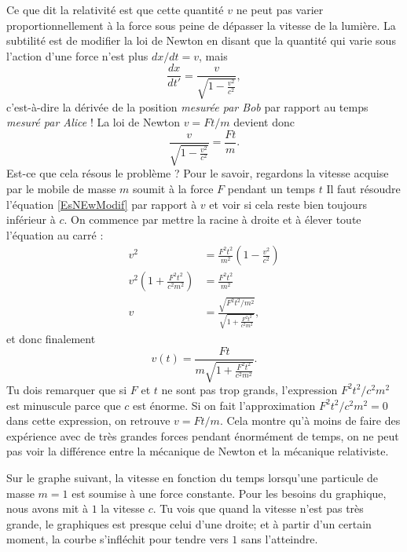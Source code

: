 Ce que dit la relativité est que cette quantité \( v\) ne peut pas varier proportionnellement à la force sous peine de dépasser la vitesse de la lumière. La subtilité est de modifier la loi de Newton en disant que la quantité qui varie sous l'action d'une force n'est plus \( dx/dt=v\), mais
\[
	\frac{ dx }{ dt' }=   \frac{ v }{ \sqrt{1-\frac{ v^2 }{ c^2 }} },
\]
c'est-à-dire la dérivée de la position \emph{mesurée par Bob} par rapport au temps \emph{mesuré par Alice} !  La loi de Newton \( v=Ft/m\) devient donc
\begin{equation}	\label{EsNEwModif}
	\frac{ v }{ \sqrt{1-\frac{ v^2 }{ c^2 }} }=\frac{ Ft }{ m }.
\end{equation}
Est-ce que cela résous le problème ? Pour le savoir, regardons la vitesse acquise par le mobile de masse \( m\) soumit à la force \( F\) pendant un temps \( t\) Il faut résoudre l'équation \eqref{EsNEwModif} par rapport à \( v\) et voir si cela reste bien toujours inférieur à \( c\). On commence par mettre la racine à droite et à élever toute l'équation au carré :
\[
	\begin{split}
		v^2&=\frac{ F^2t^2 }{ m^2 }\left( 1-\frac{ v^2 }{ c^2 } \right)\\
		v^2\left( 1+\frac{ F^2t^2 }{ c^2m^2 } \right)&=\frac{ F^2t^2 }{ m^2 }\\
		v&=\frac{ \sqrt{F^2t^2/m^2} }{ \sqrt{1+\frac{ F^2t^2 }{ c^2m^2 }} },
	\end{split}
\]
et donc finalement
\begin{equation}	\label{EqVfntRel}
	v(t)=\frac{ Ft }{ m\sqrt{1+\frac{ F^2t^2 }{ c^2m^2 }} }.
\end{equation}
Tu dois remarquer que si \( F\) et \( t\) ne sont pas trop grands, l'expression \( F^2t^2/c^2m^2\) est minuscule parce que \( c\) est énorme. Si on fait l'approximation \( F^2t^2/c^2m^2=0\) dans cette expression, on retrouve \( v=Ft/m\). Cela montre qu'à moins de faire des expérience avec de très grandes forces pendant énormément de temps, on ne peut pas voir la différence entre la mécanique de Newton et la mécanique relativiste.

\begin{center}
	
\end{center}

Sur le graphe suivant, la vitesse en fonction du temps lorsqu'une particule de masse \( m=1\) est soumise à une force constante. Pour les besoins du graphique, nous avons mit à \( 1\) la vitesse \( c\). Tu vois que quand la vitesse n'est pas très grande, le graphiques est presque celui d'une droite; et à partir d'un certain moment, la courbe s'infléchit pour tendre vers \( 1\) sans l'atteindre.


